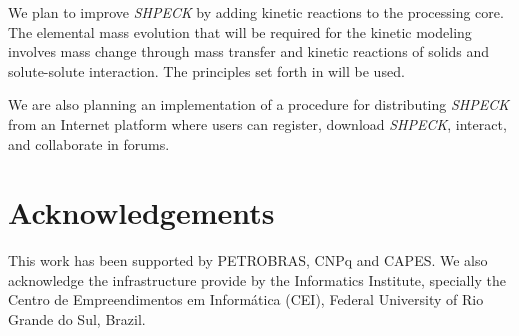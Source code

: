 \documentclass[preprint,12pt,3p]{elsarticle}
\begin{document}
We plan to improve \emph{SHPECK} by adding kinetic reactions to the processing core. The elemental mass evolution that will be required for the kinetic modeling involves mass change through mass transfer and kinetic reactions of solids and solute-solute interaction. The principles set forth in \cite{Ajpark:14} will be used.

We are also planning an implementation of a procedure for distributing \emph{SHPECK} from an Internet platform where users can register, download \emph{SHPECK}, interact, and collaborate in forums.

\section*{Acknowledgements}
This work has been supported by PETROBRAS, CNPq and CAPES. We also acknowledge the infrastructure provide by the Informatics Institute, specially the Centro de Empreendimentos em Informática (CEI), Federal University of Rio Grande do Sul, Brazil.



\newpage
%
% 
 
% 
% 
% 
% 
% 
% 
% 
% 
% 
% 


\end{document}

